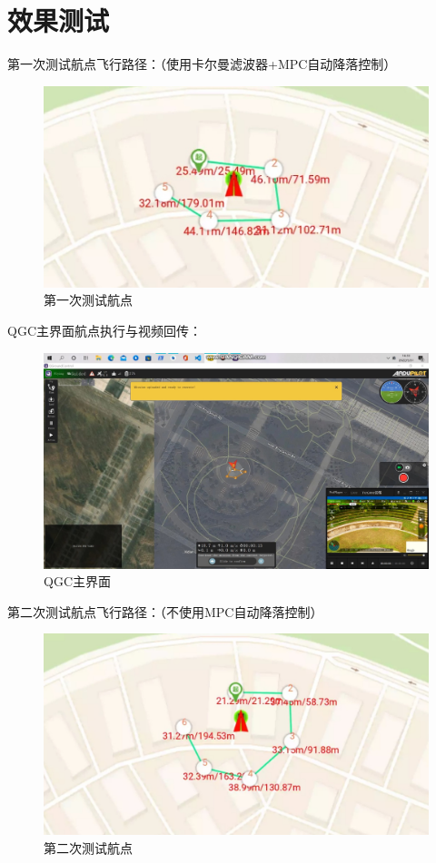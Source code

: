 \section{效果测试}

第一次测试航点飞行路径：（使用卡尔曼滤波器+MPC自动降落控制）
\begin{figure}[H]
    \centering
    \includegraphics[width=0.8\linewidth]{./Figure/Waypoint_Flight_Test1.jpg}
    \caption{第一次测试航点}\label{Fig:append_img6}
\end{figure}

QGC主界面航点执行与视频回传：
\begin{figure}[H]
  \centering
  \includegraphics[width=0.8\linewidth]{./Figure/QGC_Mission_1.jpg}
  \caption{QGC主界面}\label{Fig:append_img7}
\end{figure}

第二次测试航点飞行路径：（不使用MPC自动降落控制）
\begin{figure}[H]
    \centering
    \includegraphics[width=0.8\linewidth]{./Figure/Waypoint_Flight_Test2.jpg}
    \caption{第二次测试航点}\label{Fig:append_img8}
\end{figure}

